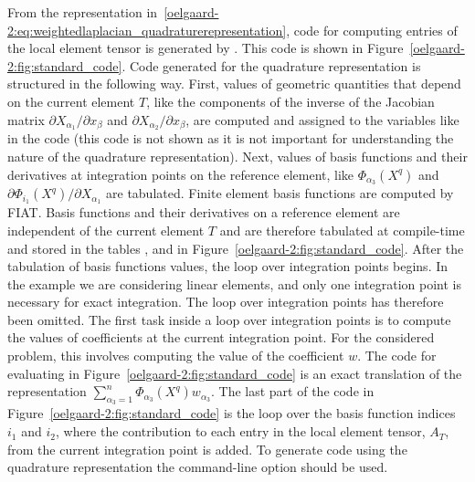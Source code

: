 From the representation
in~\eqref{oelgaard-2:eq:weightedlaplacian_quadraturerepresentation},
code for computing entries of the local element tensor is generated by
\ffc{}. This code is shown in
Figure~\ref{oelgaard-2:fig:standard_code}.  Code generated for the
quadrature representation is structured in the following way.  First,
values of geometric quantities that depend on the current element $T$,
like the components of the inverse of the Jacobian matrix $\partial
X_{\alpha_1} / \partial x_{\beta}$ and $\partial X_{\alpha_2}
/ \partial x_{\beta}$, are computed and assigned to the variables like
 in the code (this code is not shown as it is not important
for understanding the nature of the quadrature representation).  Next,
values of basis functions and their derivatives at integration points
on the reference element, like $\Phi_{\alpha_{3}}(X^q)$ and $\partial
\Phi_{i_1}(X^q) / \partial X_{\alpha_1}$ are tabulated.  Finite
element basis functions are computed by FIAT.  Basis functions and
their derivatives on a reference element are independent of the
current element $T$ and are therefore tabulated at compile-time and
stored in the tables ,  and
 in Figure~\ref{oelgaard-2:fig:standard_code}.
After the tabulation of basis functions values, the loop over
integration points begins.  In the example we are considering linear
elements, and only one integration point is necessary for exact
integration. The loop over integration points has therefore been
omitted.  The first task inside a loop over integration points is to
compute the values of coefficients at the current integration point.
For the considered problem, this involves computing the value of the
coefficient $w$.  The code for evaluating  in
Figure~\ref{oelgaard-2:fig:standard_code} is an exact translation of
the representation $\sum_{\alpha_{3}=1}^n \Phi_{\alpha_{3}}(X^q)
w_{\alpha_{3}}$.  The last part of the code in
Figure~\ref{oelgaard-2:fig:standard_code} is the loop over the basis
function indices $i_{1}$ and $i_{2}$, where the contribution to each
entry in the local element tensor, $A_{T}$, from the current
integration point is added.
To generate code using the quadrature representation the \ffc{}
command-line option  should be used.
%
